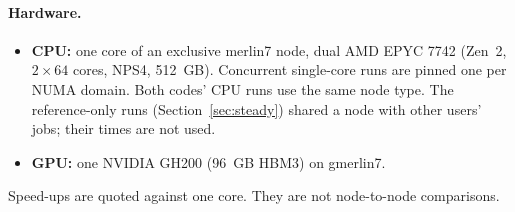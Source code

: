 \paragraph{Hardware.}
\begin{itemize}
\item \textbf{CPU:} one core of an exclusive merlin7 node, dual AMD EPYC 7742
  (Zen~2, $2 \times 64$ cores, NPS4, 512~GB). Concurrent single-core runs
  are pinned one per NUMA domain. Both codes' CPU runs use the same node type.
  The reference-only runs (Section~\ref{sec:steady}) shared a node with
  other users' jobs; their times are not used.
\item \textbf{GPU:} one NVIDIA GH200 (96~GB HBM3) on gmerlin7.
\end{itemize}
Speed-ups are quoted against one core. They are not node-to-node comparisons.
